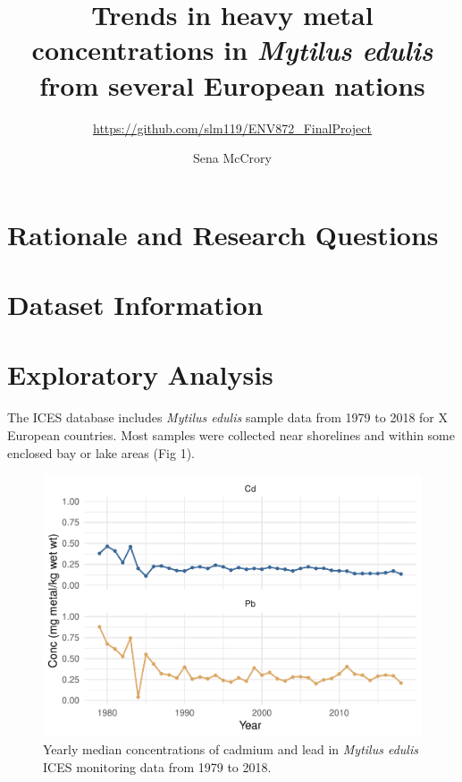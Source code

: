 \documentclass[
  12pt,
]{article}
\title{Trends in heavy metal concentrations in \emph{Mytilus edulis} from
several European nations}
\subtitle{\url{https://github.com/slm119/ENV872_FinalProject}}
\author{Sena McCrory}
\date{}
\begin{document}
\maketitle

\newpage
\tableofcontents 
\newpage
\listoftables 
\newpage
\listoffigures 
\newpage

\hypertarget{rationale-and-research-questions}{%
\section{Rationale and Research
Questions}\label{rationale-and-research-questions}}

\newpage

\hypertarget{dataset-information}{%
\section{Dataset Information}\label{dataset-information}}

\newpage

\hypertarget{exploratory-analysis}{%
\section{Exploratory Analysis}\label{exploratory-analysis}}

The ICES database includes \emph{Mytilus edulis} sample data from 1979
to 2018 for X European countries. Most samples were collected near
shorelines and within some enclosed bay or lake areas (Fig 1).

\begin{figure}
\centering
\includegraphics{McCrory_ENV972_Project_files/figure-latex/unnamed-chunk-1-1.pdf}
\caption{Yearly median concentrations of cadmium and lead in
\emph{Mytilus edulis} ICES monitoring data from 1979 to 2018.}
\end{figure}
\end{document}
